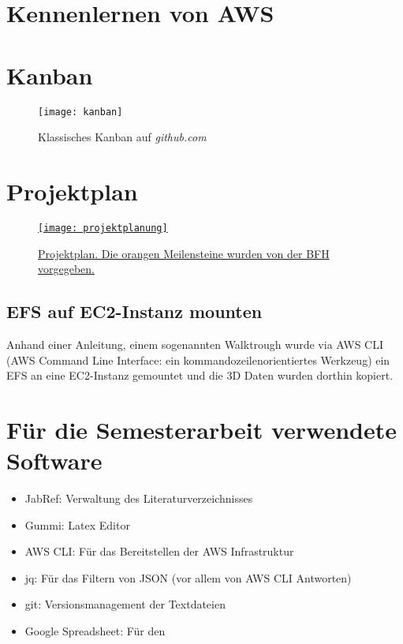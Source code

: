 \section{Kennenlernen von AWS}
\section{Kanban}\label{appendix:kanban}
\begin{figure}[H]
	\centering
	\texttt{[image: kanban]}
	\caption{Klassisches Kanban auf \emph{github.com}}
	\label{fig:Klassisches Kanban}
\end{figure}

\section{Projektplan}\label{appendix:projektplan}
\begin{figure}[H]
	\centering
	\href{https://docs.google.com/spreadsheets/d/1zKTZgt4BW736G0xRfU9o3vWYwAJj-8nzFvGsPR7yJ_0/edit?usp=sharing}{
	\texttt{[image: projektplanung]}}
	\caption{\href{https://docs.google.com/spreadsheets/d/1zKTZgt4BW736G0xRfU9o3vWYwAJj-8nzFvGsPR7yJ_0/edit?usp=sharing}{Projektplan. Die orangen Meilensteine wurden von der BFH vorgegeben.}}
	\label{fig:Projektplan}
\end{figure}

\subsection{EFS auf EC2-Instanz mounten}
Anhand einer Anleitung, einem sogenannten Walktrough wurde via AWS CLI (AWS Command Line Interface: ein kommandozeilenorientiertes Werkzeug) ein
EFS an eine EC2-Instanz gemountet und die 3D Daten wurden dorthin kopiert.

\section{Für die Semesterarbeit verwendete Software}
\begin{itemize}
\item JabRef: Verwaltung des Literaturverzeichnisses
\item Gummi: Latex Editor
\item AWS CLI: Für das Bereitstellen der AWS Infrastruktur
\item jq: Für das Filtern von JSON (vor allem von AWS CLI Antworten)
\item git: Versionsmanagement der Textdateien
\item Google Spreadsheet: Für den 
\end{itemize}